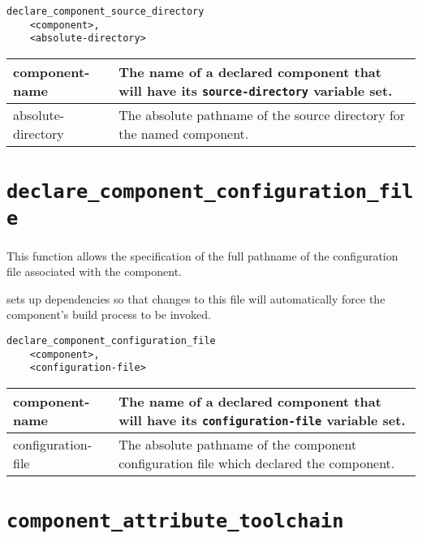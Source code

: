 \begin{minipage}{\linewidth}
\begin{verbatim}
declare_component_source_directory
    <component>,
    <absolute-directory>
\end{verbatim}

\begin{tabularx}{\linewidth}{l|X}
component-name &
  The name of a declared component that will have its
  \texttt{source-directory} variable set. \\

\hline  absolute-directory &
  The absolute pathname of the source directory for the
  named component.
\end{tabularx}
\end{minipage}

\section{\texttt{declare\_component\_configuration\_file}}\label{api:configuration-file}

This function allows the specification of the full pathname of the
configuration file associated with the component.

\lmsbw sets up dependencies so that changes to this file will
automatically force the component's build process to be invoked.

\begin{minipage}{\linewidth}
\begin{verbatim}
declare_component_configuration_file
    <component>,
    <configuration-file>
\end{verbatim}

\begin{tabularx}{\linewidth}{l|X}
component-name &
  The name of a declared component that will have its
  \texttt{configuration-file} variable set. \\
\hline configuration-file &
  The absolute pathname of the component configuration
  file which declared the component.
\end{tabularx}
\end{minipage}

\section{\texttt{component\_attribute\_toolchain}}\label{api:toolchain}

